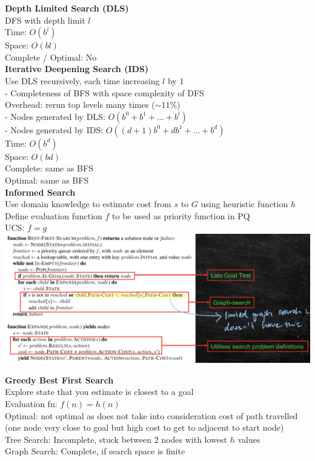 \documentclass[10pt, a4paper]{article}
\newcommand{\red}[1]{{\color{red}#1}}
\newcommand{\green}[1]{{\color{ForestGreen}#1}}
\newcommand{\header}[1]{{\normalsize\textbf{#1}}}
\newcommand{\tab}[0]{\hspace*{2mm}}
\begin{document}
\begin{multicols*}{3}
	  \textbf{Depth Limited Search (DLS)}\\
	  DFS with depth limit $l$\\
	  Time: $O(b^{l})$\\
	  Space: $O(bl)$\\
	  Complete / Optimal: No\\

	  \textbf{Iterative Deepening Search (IDS)}\\
	  Use DLS recursively, each time increasing $l$ by 1\\
	  \tab - Completeness of BFS with space complexity of DFS\\
	  Overhead: rerun top levels many times ($\sim11\%$)\\
	  \tab - Nodes generated by DLS: $O(b^{0} + b^{1} + ... + b^{l})$\\
	  \tab - Nodes generated by IDS: $O((d + 1)b^{0} + db^{1} + ... + b^{d})$\\
	  Time: $O(b^{d})$\\
	  Space: $O(bd)$\\
	  Complete: same as BFS\\
	  Optimal: same as BFS\\

	  \header{Informed Search}\\
	  Use domain knowledge to estimate cost from $s$ to $G$ using heuristic function $h$\\
	  Define \red{evaluation function} $f$ to be used as priority function in PQ\\
	  UCS: $f = g$\\
	  \includegraphics[scale=.16]{./assets/bestFirst.png}

	  \textbf{Greedy Best First Search}\\
	  Explore state that you estimate is closest to a goal\\
	  Evaluation fn: \green{$f(n) = h(n)$}\\
	  Optimal: \red{not optimal} as does not take into consideration cost of path travelled (one node very close to goal but high cost to get to adjacent to start node)\\
	  Tree Search: \red{Incomplete}, stuck between 2 nodes with lowest $h$ values\\
	  Graph Search: \red{Complete}, if search space is finite\\


\end{multicols*}
\end{document}

